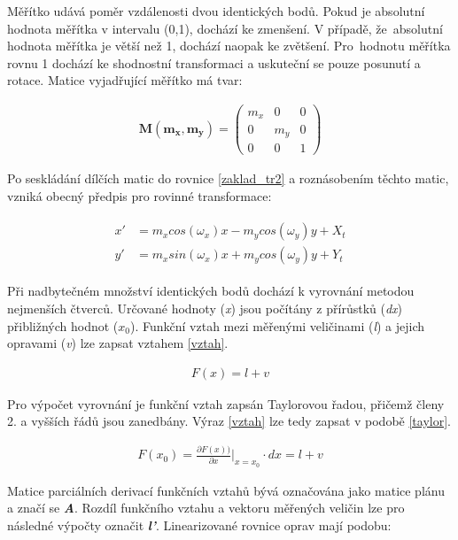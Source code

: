 \documentclass[thesis=M,czech]{FITthesis}[2012/06/26]
\begin{document}
Měřítko udává poměr vzdálenosti dvou identických bodů. Pokud je absolutní hodnota měřítka v intervalu (0,1), dochází ke zmenšení. V případě, že~absolutní hodnota měřítka je větší než 1, dochází naopak ke zvětšení. Pro~hodnotu měřítka rovnu 1 dochází ke shodnostní transformaci a uskuteční se pouze posunutí a rotace. Matice vyjadřující měřítko má tvar:

\begin{align} \label{matM}
\boldsymbol {M (m_x, m_y)} = \begin{pmatrix}
    m_x & 0 & 0 \\
    0 & m_y & 0 \\
    0 & 0 & 1 
\end{pmatrix}
\end{align}

Po seskládání dílčích matic do rovnice \eqref{zaklad_tr2} a roznásobením těchto matic, vzniká obecný předpis pro rovinné transformace:

\begin{align}  \label{obec-transf} 
\begin{split}
x' &= m_x cos(\omega_x) x - m_y cos(\omega_y) y + X_t  \\
y' &= m_x sin(\omega_x) x + m_y cos(\omega_y) y + Y_t 
\end{split}
\end{align}

Při nadbytečném množství identických bodů dochází k vyrovnání metodou nejmenších čtverců. Určované hodnoty (\textit{x}) jsou počítány z přírůstků (\textit{dx}) přibližných hodnot (\textit{$x_0$}). Funkční vztah mezi měřenými veličinami (\textit{l}) a jejich opravami (\textit{v}) lze zapsat vztahem \eqref{vztah}. 

\begin{align}\label{vztah}
F(x) = l + v
\end{align}

Pro výpočet vyrovnání je funkční vztah zapsán Taylorovou řadou, přičemž členy 2. a vyšších řádů jsou zanedbány. Výraz \eqref{vztah} lze tedy zapsat v podobě \eqref{taylor}.

\begin{align}\label{taylor}
F(x_0) = \frac{\partial F(x))}{\partial x} \Bigr\rvert_{x = x_0} \cdot dx = l + v
\end{align}

Matice parciálních derivací funkčních vztahů bývá označována jako matice plánu a značí se \textbf{\textit{A}}. Rozdíl funkčního vztahu a vektoru měřených veličin lze pro následné výpočty označit \textbf{\textit{l'}}. Linearizované rovnice oprav mají podobu:
\end{document}

